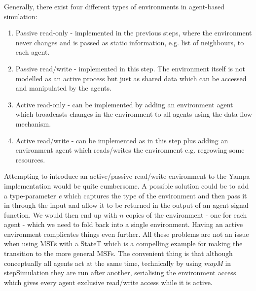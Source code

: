 Generally, there exist four different types of environments in agent-based simulation:
\begin{enumerate}
	\item Passive read-only - implemented in the previous steps, where the environment never changes and is passed as static information, e.g. list of neighbours, to each agent.
	\item Passive read/write - implemented in this step. The environment itself is not modelled as an active process but just as shared data which can be accessed and manipulated by the agents.
	\item Active  read-only - can be implemented by adding an environment agent which broadcasts changes in the environment to all agents using the data-flow mechanism.
	\item Active read/write - can be implemented as in this step plus adding an environment agent which reads/writes the environment e.g. regrowing some resources.
\end{enumerate}

Attempting to introduce an active/passive read/write environment to the Yampa implementation would be quite cumbersome. A possible solution could be to add a type-parameter \textit{e} which captures the type of the environment and then pass it in through the input and allow it to be returned in the output of an agent signal function. We would then end up with $n$ copies of the environment - one for each agent - which we need to fold back into a single environment. Having an active environment complicates things even further. All these problems are not an issue when using MSFs with a StateT which is a compelling example for making the transition to the more general MSFs. The convenient thing is that although conceptually all agents act at the same time, technically by using \textit{mapM} in stepSimulation they are run after another, serialising the environment access which gives every agent exclusive read/write access while it is active.

